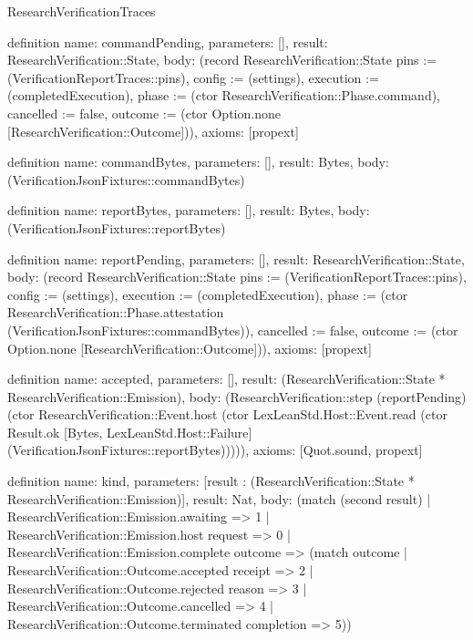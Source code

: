 \begin{lexlean}{ResearchVerificationTraces}
\begin{semanticmodule}
definition{
  name: commandPending,
  parameters: [],
  result: ResearchVerification::State,
  body: (record ResearchVerification::State {pins := (VerificationReportTraces::pins), config := (settings), execution := (completedExecution), phase := (ctor ResearchVerification::Phase.command), cancelled := false, outcome := (ctor Option.none [ResearchVerification::Outcome])}),
  axioms: [propext]
}

definition{
  name: commandBytes,
  parameters: [],
  result: Bytes,
  body: (VerificationJsonFixtures::commandBytes)
}

definition{
  name: reportBytes,
  parameters: [],
  result: Bytes,
  body: (VerificationJsonFixtures::reportBytes)
}

definition{
  name: reportPending,
  parameters: [],
  result: ResearchVerification::State,
  body: (record ResearchVerification::State {pins := (VerificationReportTraces::pins), config := (settings), execution := (completedExecution), phase := (ctor ResearchVerification::Phase.attestation (VerificationJsonFixtures::commandBytes)), cancelled := false, outcome := (ctor Option.none [ResearchVerification::Outcome])}),
  axioms: [propext]
}

definition{
  name: accepted,
  parameters: [],
  result: (ResearchVerification::State * ResearchVerification::Emission),
  body: (ResearchVerification::step (reportPending) (ctor ResearchVerification::Event.host (ctor LexLeanStd.Host::Event.read (ctor Result.ok [Bytes, LexLeanStd.Host::Failure] (VerificationJsonFixtures::reportBytes))))),
  axioms: [Quot.sound, propext]
}

definition{
  name: kind,
  parameters: [result : (ResearchVerification::State * ResearchVerification::Emission)],
  result: Nat,
  body: (match (second result) | ResearchVerification::Emission.awaiting => 1 | ResearchVerification::Emission.host request => 0 | ResearchVerification::Emission.complete outcome => (match outcome | ResearchVerification::Outcome.accepted receipt => 2 | ResearchVerification::Outcome.rejected reason => 3 | ResearchVerification::Outcome.cancelled => 4 | ResearchVerification::Outcome.terminated completion => 5))
}


\end{semanticmodule}
\end{lexlean}
